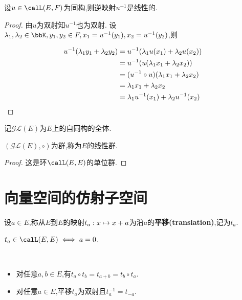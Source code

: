 \begin{prop}
    设$u \in \calL(E, F)$为同构,则逆映射$u^{-1}$是线性的.
\end{prop}

\begin{proof}
    由$u$为双射知$u^{-1}$也为双射.
    设$\lambda_1, \lambda_2 \in \bbK, y_1, y_2 \in F, x_1 = u^{-1}(y_1), x_2 = u^{-1}(y_2)$,则

    \begin{align*}
        u^{-1}(\lambda_1 y_1 + \lambda_2 y_2) & =u^{-1}(\lambda_1 u(x_1) + \lambda_2 u(x_2)) \\
        & = u^{-1}(u(\lambda_1 x_1 + \lambda_2 x_2)) \\
        & = (u^{-1} \circ u)(\lambda_1 x_1 + \lambda_2 x_2) \\
        & = \lambda_1 x_1 + \lambda_2 x_2 \\
        & = \lambda_1 u^{-1}(x_1) + \lambda_2 u^{-1}(x_2) \qedhere
    \end{align*}
\end{proof}

\begin{deff}
    记$\mathcal{GL}(E)$为$E$上的自同构的全体.
\end{deff}

\begin{prop}
    $(\mathcal{GL}(E), \circ)$为群,称为$E$的线性群.
\end{prop}

\begin{proof}
    这是环$\calL(E, E)$的单位群.
\end{proof}

\section{向量空间的仿射子空间}

\begin{deff}
    设$a \in E$,称从$E$到$E$的映射$t_a: x \mapsto x + a$为沿$a$的\textbf{平移(translation)},记为$t_a$.
\end{deff}

\begin{rqq}
    $t_a \in \calL(E, E) \iff a = 0$.
\end{rqq}

\begin{prop} $\ $
    \begin{itemize}
        \item 对任意$a, b \in E$,有$t_a \circ t_b = t_{a + b} = t_b \circ t_a$.
        \item 对任意$a \in E$,平移$t_a$为双射且$t_a^{-1} = t_{-a}$.
    \end{itemize}
\end{prop}

